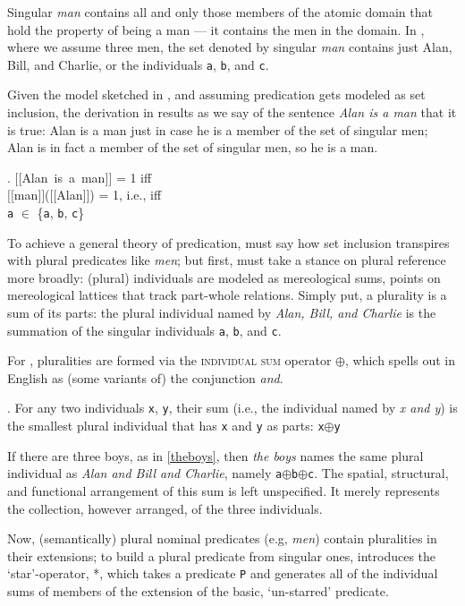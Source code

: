 \documentclass[linguex]{sp}
\newcommand{\sem}[1]{\mbox{$[\![$#1$]\!]$}}
\renewcommand{\tt}{\texttt}
\begin{document}
Singular \emph{man} contains all and only those members of the atomic domain that hold the property of being a man --- it contains the men in the domain. In \Last, where we assume three men, the set denoted by singular \emph{man} contains just Alan, Bill, and Charlie, or the individuals \tt{a}, \tt{b}, and \tt{c}.

Given the model sketched in \Last, and assuming predication gets modeled as set inclusion, the derivation in \Next results as we say of the sentence \emph{Alan is a man} that it is true: Alan is a man just in case he is a member of the set of singular men; Alan is in fact a member of the set of singular men, so he is a man.

\ex. \sem{Alan is a man} = 1 iff\\
\sem{man}(\sem{Alan}) = 1, i.e., iff\\
\texttt{a} $\in$ \{\texttt{a}, \texttt{b}, \texttt{c}\}

To achieve a general theory of predication, \citeauthor{link1983} must say how set inclusion transpires with plural predicates like \emph{men}; but first, \citeauthor{link1983} must take a stance on plural reference more broadly: (plural) individuals are modeled as mereological sums, points on mereological lattices that track part-whole relations. Simply put, a plurality is a sum of its parts: the plural individual named by \emph{Alan, Bill, and Charlie} is the summation of the singular individuals \tt{a}, \tt{b}, and \tt{c}. 

For \citeauthor{link1983}, pluralities are formed via the \textsc{individual sum} operator $\oplus$, which spells out in English as (some variants of) the conjunction \emph{and}.

\ex. For any two individuals \texttt{x}, \texttt{y}, their sum (i.e., the individual named by \emph{x and y}) is the smallest plural individual that has \texttt{x} and \texttt{y} as parts: \texttt{x}$\oplus$\texttt{y}

If there are three boys, as in \ref{theboys}, then \emph{the boys} names the same plural individual as \emph{Alan and Bill and Charlie}, namely \texttt{a}$\oplus$\texttt{b}$\oplus$\texttt{c}. The spatial, structural, and functional arrangement of this sum is left unspecified. It merely represents the collection, however arranged, of the three individuals.

Now, (semantically) plural nominal predicates (e.g, \emph{men}) contain pluralities in their extensions; to build a plural predicate from singular ones, \citeauthor{link1983} introduces the `star'-operator, *, which takes a predicate \texttt{P} and generates all of the individual sums of members of the extension of the basic, `un-starred' predicate.
\end{document}
